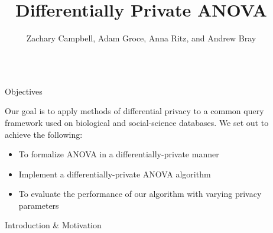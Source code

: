 \documentclass[final]{beamer}
\title{Differentially Private ANOVA} %
\author{Zachary Campbell, Adam Groce, Anna Ritz, and Andrew Bray} %
\institute{Reed College} %
\newlength{\sepwid}
\newlength{\onecolwid}
\begin{document}

\setlength{\belowcaptionskip}{2ex} %
\setlength\belowdisplayshortskip{2ex} %

\begin{frame}[t] %

\begin{columns}[t] %

\begin{column}{\sepwid}\end{column} %

\begin{column}{\onecolwid} %


\begin{alertblock}{Objectives}

Our goal is to apply methods of differential privacy to a common query framework used on biological and social-science databases. We set out to achieve the following:

\begin{itemize}
\item To formalize ANOVA in a differentially-private manner
\item Implement a differentially-private ANOVA algorithm 
\item To evaluate the performance of our algorithm with varying privacy parameters 
\end{itemize}

\end{alertblock}


\begin{block}{Introduction \& Motivation}



\end{block}
\end{column}
\end{columns}
\end{frame}
\end{document}
